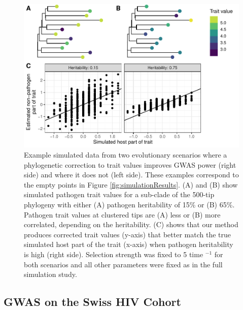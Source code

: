 \documentclass[11pt]{article}
\begin{document}
\begin{linenumbers}
\begin{figure}[H]
	\begin{center}
		\includegraphics[width=\linewidth]{figures/example_simulation_trait_values}
		\caption{Example simulated data from two evolutionary scenarios where a phylogenetic correction to trait values improves GWAS power (right side) and where it does not (left side). These examples correspond to the empty points in Figure \ref{fig:simulationResults}. (A) and (B) show simulated pathogen trait values for a sub-clade of the 500-tip phylogeny with either (A) pathogen heritability of 15\% or (B) 65\%. Pathogen trait values at clustered tips are (A) less or (B) more correlated, depending on the heritability. (C) shows that our method produces corrected trait values (y-axis) that better match the true simulated host part of the trait (x-axis) when pathogen heritability is high (right side). Selection strength was fixed to 5 time $^{-1}$ for both scenarios and all other parameters were fixed as in the full simulation study.}
		\label{fig:simulationTraitExample}
	\end{center}
\end{figure}

\subsection*{GWAS on the Swiss HIV Cohort}


\end{linenumbers}
\end{document}

